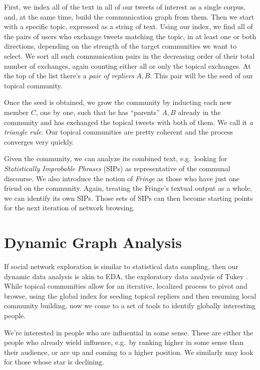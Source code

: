\documentclass[10pt,oneside]{memoir}
\begin{document}
First, we index all of the text in all of our tweets of interest as a single corpus, and, at the same time, build the communication graph from them.   Then we start with a specific topic, expressed as a string of text.  Using our index, we find all of the pairs of users who exchange tweets matching the topic, in at least one or both directions, depending on the strength of the target communities we want to select.  We sort all such communication pairs in the decreasing order of their total number of exchanges, again counting either all or only the topical exchanges.  At the top of the list there's a {\itshape pair of repliers} ${A,B}$.  This pair will be the seed of our topical community.  


Once the seed is obtained, we grow the community by inducting each new member $C$, one by one, such that he has ``parents'' ${A,B}$ already in the community and has exchanged the topical tweets with both of them.  We call it {\itshape a triangle rule}.  Our topical communities are pretty coherent and the process converges very quickly.


Given the community, we can analyze its combined text, e.g.\ looking for {\itshape Statistically Improbable Phrases} (SIPs) as representative of the communal discourse.  We also introduce the notion of {\itshape Fringe} as those who have just one friend on the community.  Again, treating the Fringe's textual output as a whole, we can identify its own SIPs.  Those sets of SIPs can then become starting points for the next iteration of network browsing.


\pagebreak \section{Dynamic Graph Analysis}
\label{dynamicgraphanalysis}

If social network exploration is similar to statistical data sampling, then our dynamic data analysis is akin to   EDA, the exploratory data analysis of Tukey \cite{Tukey:1977:EDA}.  While topical communities allow for an iterative, localized process to pivot and browse, using the global index for seeding topical repliers and then resuming local community building, now we come to a set of tools to identify globally interesting people.


We're interested in people who are influential in some sense.  These are either the people who already wield influence, e.g.\ by ranking higher in some sense than their audience, or are up and coming to a higher position.  We similarly may look for those whose star is declining.
\end{document}
